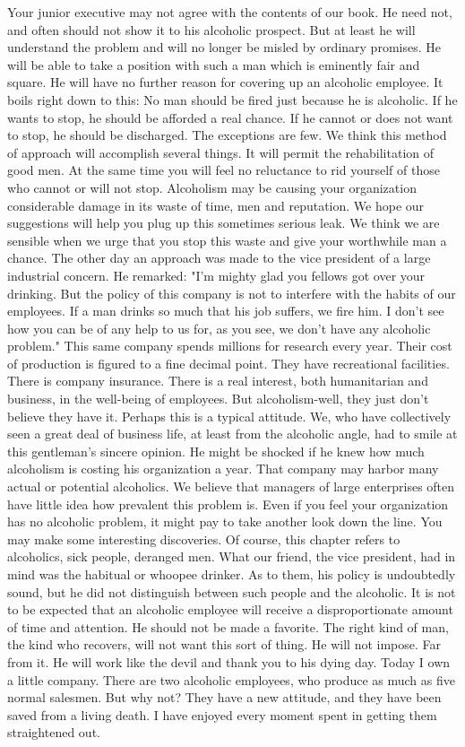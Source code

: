 \begin{biblechapter}
Your junior executive may not agree with the contents of our book.  He need not, and often should not show it to his alcoholic prospect.  But at least he will understand the problem and will no longer be misled by ordinary promises.  He will be able to take a position with such a man which is eminently fair and square.  He will have no further reason for covering up an alcoholic employee.
It boils right down to this:  No man should be fired just because he is alcoholic.  If he wants to stop, he should be afforded a real chance.  If he cannot or does not want to stop, he should be discharged.  The exceptions are few.
We think this method of approach will accomplish several things.  It will permit the rehabilitation of good men.  At the same time you will feel no reluctance to rid yourself of those who cannot or will not stop.  Alcoholism may be causing your organization considerable damage in its waste of time, men and reputation.  We hope our suggestions will help you plug up this sometimes serious leak.  We think we are sensible when we urge that you stop this waste and give your worthwhile man a chance.
The other day an approach was made to the vice president of a large industrial concern.  He remarked:  "I'm mighty glad you fellows got over your drinking.  But the policy of this company is not to interfere with the habits of our employees.  If a man drinks so much that his job suffers, we fire him.  I don't see how you can be of any help to us for, as you see, we don't have any alcoholic problem."  This same company spends millions for research every year.  Their cost of production is figured to a fine decimal point.  They have recreational facilities.  There is company insurance.  There is a real interest, both humanitarian and business, in the well-being of employees.  But alcoholism-well, they just don't believe they have it.
Perhaps this is a typical attitude.  We, who have collectively seen a great deal of business life, at least from the alcoholic angle, had to smile at this gentleman's sincere opinion.  He might be shocked if he knew how much alcoholism is costing his organization a year.  That company may harbor many actual or potential alcoholics.  We believe that managers of large enterprises often have little idea how prevalent this problem is.  Even if you feel your organization has no alcoholic problem, it might pay to take another look down the line.  You may make some interesting discoveries.
Of course, this chapter refers to alcoholics, sick people, deranged men.  What our friend, the vice president, had in mind was the habitual or whoopee drinker.  As to them, his policy is undoubtedly sound, but he did not distinguish between such people and the alcoholic.
It is not to be expected that an alcoholic employee will receive a disproportionate amount of time and attention.  He should not be made a favorite.  The right kind of man, the kind who recovers, will not want this sort of thing.  He will not impose.  Far from it.  He will work like the devil and thank you to his dying day.
Today I own a little company.  There are two alcoholic employees, who produce as much as five normal salesmen.  But why not?  They have a new attitude, and they have been saved from a living death.  I have enjoyed every moment spent in getting them straightened out.
\end{biblechapter}
